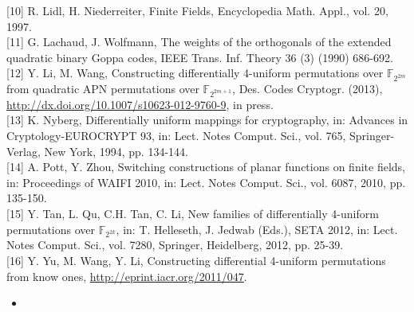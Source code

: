 \documentclass[10pt]{article}
\begin{document}
[10] R. Lidl, H. Niederreiter, Finite Fields, Encyclopedia Math. Appl., vol. 20, 1997.\\[0pt]
[11] G. Lachaud, J. Wolfmann, The weights of the orthogonals of the extended quadratic binary Goppa codes, IEEE Trans. Inf. Theory 36 (3) (1990) 686-692.\\[0pt]
[12] Y. Li, M. Wang, Constructing differentially 4-uniform permutations over $\mathbb{F}_{2^{2 m}}$ from quadratic APN permutations over $\mathbb{F}_{2^{2 m+1}}$, Des. Codes Cryptogr. (2013), \href{http://dx.doi.org/10.1007/s10623-012-9760-9}{http://dx.doi.org/10.1007/s10623-012-9760-9}, in press.\\[0pt]
[13] K. Nyberg, Differentially uniform mappings for cryptography, in: Advances in Cryptology-EUROCRYPT 93, in: Lect. Notes Comput. Sci., vol. 765, Springer-Verlag, New York, 1994, pp. 134-144.\\[0pt]
[14] A. Pott, Y. Zhou, Switching constructions of planar functions on finite fields, in: Proceedings of WAIFI 2010, in: Lect. Notes Comput. Sci., vol. 6087, 2010, pp. 135-150.\\[0pt]
[15] Y. Tan, L. Qu, C.H. Tan, C. Li, New families of differentially 4-uniform permutations over $\mathbb{F}_{2^{2 k}}$, in: T. Helleseth, J. Jedwab (Eds.), SETA 2012, in: Lect. Notes Comput. Sci., vol. 7280, Springer, Heidelberg, 2012, pp. 25-39.\\[0pt]
[16] Y. Yu, M. Wang, Y. Li, Constructing differential 4-uniform permutations from know ones, \href{http://eprint.iacr.org/2011/047}{http://eprint.iacr.org/2011/047}.

\begin{itemize}
  \item 
\end{itemize}
\end{document}
